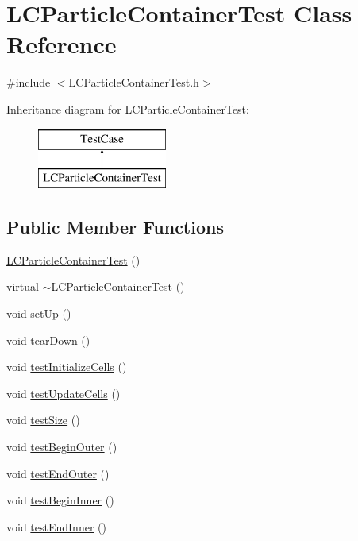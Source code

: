 \hypertarget{classLCParticleContainerTest}{\section{L\-C\-Particle\-Container\-Test Class Reference}
\label{classLCParticleContainerTest}
}


{\ttfamily \#include $<$L\-C\-Particle\-Container\-Test.\-h$>$}

Inheritance diagram for L\-C\-Particle\-Container\-Test\-:\begin{figure}[H]
\begin{center}
\leavevmode
\includegraphics[height=2.000000cm]{classLCParticleContainerTest}
\end{center}
\end{figure}
\subsection*{Public Member Functions}
\begin{DoxyCompactItemize}
\item 
\hyperlink{classLCParticleContainerTest_a4380a3e7b13265e7df9c77af7a17ed5e}{L\-C\-Particle\-Container\-Test} ()
\item 
virtual \hyperlink{classLCParticleContainerTest_a505ea2563557a170d29b73efebe26e54}{$\sim$\-L\-C\-Particle\-Container\-Test} ()
\item 
void \hyperlink{classLCParticleContainerTest_ab6316e2780ff2cc8d3da231786d36e68}{set\-Up} ()
\item 
void \hyperlink{classLCParticleContainerTest_af95ad5278871f5d39305fa31def2ddc8}{tear\-Down} ()
\item 
void \hyperlink{classLCParticleContainerTest_afd02efdfde88db8256a531384bbbcfba}{test\-Initialize\-Cells} ()
\item 
void \hyperlink{classLCParticleContainerTest_a56a27be4affd57f6d765c1cde0f12e8c}{test\-Update\-Cells} ()
\item 
void \hyperlink{classLCParticleContainerTest_a334dcf062e2594cca2408c0c2713ef67}{test\-Size} ()
\item 
void \hyperlink{classLCParticleContainerTest_a29488b517572e40978e2847a7b48a64b}{test\-Begin\-Outer} ()
\item 
void \hyperlink{classLCParticleContainerTest_a46bca7862943f675190519ecb479fb16}{test\-End\-Outer} ()
\item 
void \hyperlink{classLCParticleContainerTest_a1a68785ecc6c7904ddd7d57c4184d5a8}{test\-Begin\-Inner} ()
\item 
void \hyperlink{classLCParticleContainerTest_a4c8f0fd1aac5a10fa9a6c345b3b7f15b}{test\-End\-Inner} ()
\end{DoxyCompactItemize}
